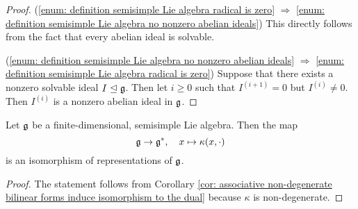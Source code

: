 \begin{proof}
 (\ref{enum: definition semisimple Lie algebra radical is zero} $\Rightarrow$ \ref{enum: definition semisimple Lie algebra no nonzero abelian ideals}) This directly follows from the fact that every abelian ideal is solvable.
 
 (\ref{enum: definition semisimple Lie algebra no nonzero abelian ideals} $\Rightarrow$ \ref{enum: definition semisimple Lie algebra radical is zero}) Suppose that there exists a nonzero solvable ideal $I \trianglelefteq \mathfrak{g}$. Then let $i \geq 0$ such that $I^{(i+1)} = 0$ but $I^{(i)} \neq 0$. Then $I^{(i)}$ is a nonzero abelian ideal in $\mathfrak{g}$.
\end{proof}


\begin{cor}
 Let $\mathfrak{g}$ be a finite-dimensional, semisimple Lie algebra. Then the map
 \[
  \mathfrak{g} \to \mathfrak{g}^*, \quad x \mapsto \kappa(x,\cdot)
 \]
 is an isomorphism of representations of $\mathfrak{g}$.
\end{cor}
\begin{proof}
 The statement follows from Corollary \ref{cor: associative non-degenerate bilinear forms induce isomorphism to the dual} because $\kappa$ is non-degenerate.
\end{proof}

